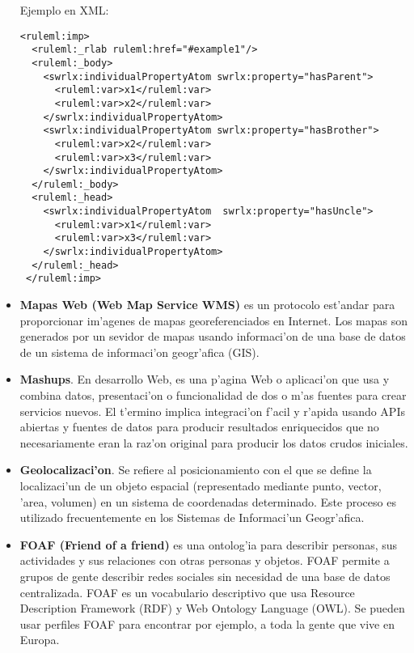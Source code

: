 \documentclass[11pt]{article}
\begin{document}
\begin{itemize}
Ejemplo en XML:

\begin{verbatim}
<ruleml:imp>
  <ruleml:_rlab ruleml:href="#example1"/>
  <ruleml:_body>
    <swrlx:individualPropertyAtom swrlx:property="hasParent">
      <ruleml:var>x1</ruleml:var>
      <ruleml:var>x2</ruleml:var>
    </swrlx:individualPropertyAtom>
    <swrlx:individualPropertyAtom swrlx:property="hasBrother">
      <ruleml:var>x2</ruleml:var>
      <ruleml:var>x3</ruleml:var>
    </swrlx:individualPropertyAtom>
  </ruleml:_body>
  <ruleml:_head>
    <swrlx:individualPropertyAtom  swrlx:property="hasUncle">
      <ruleml:var>x1</ruleml:var>
      <ruleml:var>x3</ruleml:var>
    </swrlx:individualPropertyAtom>
  </ruleml:_head>
 </ruleml:imp>

\end{verbatim}
\item \textbf{Mapas Web (Web Map Service WMS)} es un protocolo est'andar para proporcionar im'agenes de mapas georeferenciados en Internet. Los mapas son generados por un sevidor de mapas usando informaci'on de una base de datos de un sistema de informaci'on geogr'afica (GIS).
\item \textbf{Mashups}. En desarrollo Web, es una p'agina Web o aplicaci'on que usa y combina datos, presentaci'on o funcionalidad de dos o m'as fuentes para crear servicios nuevos. El t'ermino implica integraci'on f'acil y r'apida usando APIs abiertas y fuentes de datos para producir resultados enriquecidos que no necesariamente eran la raz'on original para producir los datos crudos iniciales.
\item \textbf{Geolocalizaci'on}. Se refiere al posicionamiento con el que se define la localizaci'un de un objeto espacial (representado mediante punto, vector, 'area, volumen) en un sistema de coordenadas determinado. Este proceso es utilizado frecuentemente en los Sistemas de Informaci'un Geogr'afica.
\item \textbf{FOAF (Friend of a friend)} es una ontolog'ia para describir personas, sus actividades y sus relaciones con otras personas y objetos. FOAF permite a grupos de gente describir redes sociales sin necesidad de una base de datos centralizada. FOAF es un vocabulario descriptivo que usa Resource Description Framework (RDF) y Web Ontology Language (OWL). Se pueden usar perfiles FOAF para encontrar por ejemplo, a toda la gente que vive en Europa.
\end{itemize}

\newpage


\end{document}
